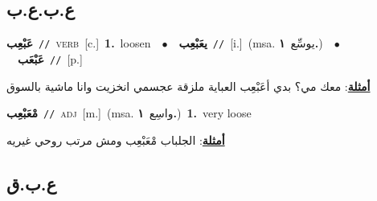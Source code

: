 \documentclass[10pt,a4paper,twoside]{article} %
\begin{document}
\begin{multicols}{2}
{{{{{{{\vspace{-3mm}
\subsection*{\color{blue}\foreignlanguage{arabic}{ع.ب.ع.ب}\color{blue}{}} 

{\setlength\topsep{0pt}\textbf{\foreignlanguage{arabic}{عَبْعِب}}\ {\color{gray}\texttt{//}\color{black}}\ \textsc{verb}\ [c.]\ \textbf{1.}~loosen\ \ $\bullet$\ \ \setlength\topsep{0pt}\textbf{\foreignlanguage{arabic}{يعَبْعِب}}\ {\color{gray}\texttt{//}\color{black}}\ [i.]\ \color{gray}(msa. \foreignlanguage{arabic}{يوسِّع}~\foreignlanguage{arabic}{\textbf{١.}})\color{black}\ \ $\bullet$\ \ \setlength\topsep{0pt}\textbf{\foreignlanguage{arabic}{عَبْعَب}}\ {\color{gray}\texttt{//}\color{black}}\ [p.]\  \begin{flushright}\color{gray}\foreignlanguage{arabic}{\textbf{\underline{\foreignlanguage{arabic}{أمثلة}}}: معك مي؟ بدي أعَبْعِب العباية ملزقة عجسمي انخزيت وانا ماشية بالسوق}\end{flushright}\color{black}} \vspace{2mm}

{\setlength\topsep{0pt}\textbf{\foreignlanguage{arabic}{مْعَبْعِب}}\ {\color{gray}\texttt{//}\color{black}}\ \textsc{adj}\ [m.]\ \color{gray}(msa. \foreignlanguage{arabic}{واسِع}~\foreignlanguage{arabic}{\textbf{١.}})\color{black}\ \textbf{1.}~very loose\  \begin{flushright}\color{gray}\foreignlanguage{arabic}{\textbf{\underline{\foreignlanguage{arabic}{أمثلة}}}: الجلباب مْعَبْعِب ومش مرتب روحي غيريه}\end{flushright}\color{black}} \vspace{2mm}

\vspace{-3mm}
\subsection*{\color{blue}\foreignlanguage{arabic}{ع.ب.ق}\color{blue}{}} 

}}}}}}}
\end{multicols}
\end{document}

